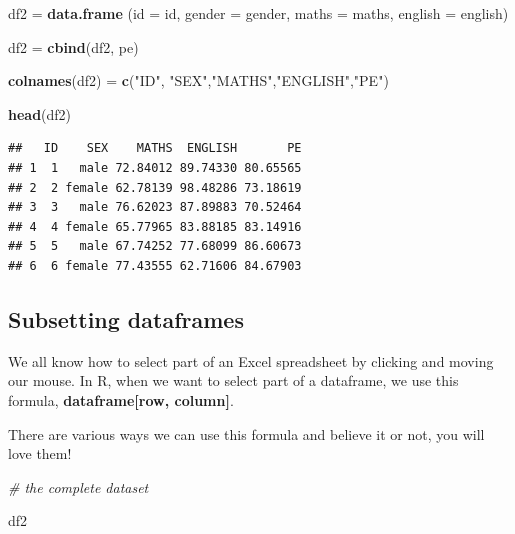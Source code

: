 \documentclass[]{book}
\newenvironment{Shaded}{\begin{snugshade}}{\end{snugshade}}
\newcommand{\KeywordTok}[1]{\textcolor[rgb]{0.13,0.29,0.53}{\textbf{#1}}}
\newcommand{\DataTypeTok}[1]{\textcolor[rgb]{0.13,0.29,0.53}{#1}}
\newcommand{\StringTok}[1]{\textcolor[rgb]{0.31,0.60,0.02}{#1}}
\newcommand{\CommentTok}[1]{\textcolor[rgb]{0.56,0.35,0.01}{\textit{#1}}}
\newcommand{\NormalTok}[1]{#1}
\begin{document}
\begin{Shaded}
\begin{Highlighting}[]
\NormalTok{df2 =}\StringTok{ }\KeywordTok{data.frame}\NormalTok{ (}\DataTypeTok{id =}\NormalTok{ id, }\DataTypeTok{gender =}\NormalTok{ gender, }\DataTypeTok{maths =}\NormalTok{ maths, }\DataTypeTok{english =}\NormalTok{ english)}

\NormalTok{df2 =}\StringTok{ }\KeywordTok{cbind}\NormalTok{(df2, pe)}

\KeywordTok{colnames}\NormalTok{(df2) =}\StringTok{ }\KeywordTok{c}\NormalTok{(}\StringTok{"ID"}\NormalTok{, }\StringTok{"SEX"}\NormalTok{,}\StringTok{"MATHS"}\NormalTok{,}\StringTok{"ENGLISH"}\NormalTok{,}\StringTok{"PE"}\NormalTok{)}

\KeywordTok{head}\NormalTok{(df2)}
\end{Highlighting}
\end{Shaded}

\begin{verbatim}
##   ID    SEX    MATHS  ENGLISH       PE
## 1  1   male 72.84012 89.74330 80.65565
## 2  2 female 62.78139 98.48286 73.18619
## 3  3   male 76.62023 87.89883 70.52464
## 4  4 female 65.77965 83.88185 83.14916
## 5  5   male 67.74252 77.68099 86.60673
## 6  6 female 77.43555 62.71606 84.67903
\end{verbatim}

\subsection{Subsetting dataframes}\label{subsetting-dataframes}

We all know how to select part of an Excel spreadsheet by clicking and
moving our mouse. In R, when we want to select part of a dataframe, we
use this formula, \textbf{dataframe{[}row, column{]}}.

There are various ways we can use this formula and believe it or not,
you will love them!

\begin{Shaded}
\begin{Highlighting}[]
\CommentTok{# the complete dataset}

\NormalTok{df2}
\end{Highlighting}
\end{Shaded}
\end{document}
